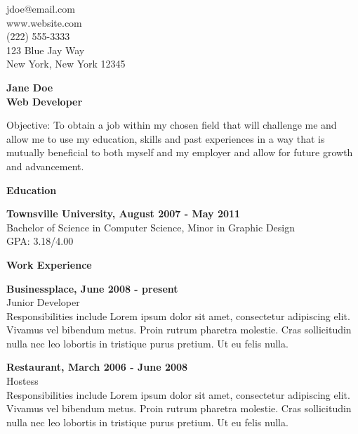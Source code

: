 \documentclass[a4paper,11pt,final]{memoir}
\newcommand{\Sep}{\vspace{1.5em}}
\newcommand{\SmallSep}{\vspace{0.5em}}
\newcommand{\CVSection}[1]
    {\Large\textbf{#1}\par
    \SmallSep\normalsize\normalfont}
\newcommand{\CVItem}[1]
    {\textbf{\color{RoyalBlue} #1}}
\begin{document}
%

\begin{flushright}\small 
    jdoe@email.com  \\
    www.website.com \\
    (222) 555-3333 \\
    123 Blue Jay Way \\
    New York, New York 12345 \\
\end{flushright}\normalsize
\framebreak


\Huge\bfseries {Jane Doe} \\
\Large\bfseries  {\color{RoyalBlue} Web Developer} \\

\normalsize\normalfont

Objective: To obtain a job within my chosen field that will challenge me and allow me to use my education, skills and past experiences in a way that is mutually beneficial to both myself and my employer and allow for future growth and advancement.
\Sep

\CVSection{Education}
\CVItem{Townsville University, August 2007 - May 2011}\\
Bachelor of Science in Computer Science, Minor in Graphic Design \\
GPA: 3.18/4.00
\SmallSep

\CVSection{Work Experience}
\CVItem{Businessplace, June 2008 - present}\\
Junior Developer \SmallSep \\
Responsibilities include Lorem ipsum dolor sit amet, consectetur adipiscing elit. Vivamus vel bibendum metus. Proin rutrum pharetra molestie. Cras sollicitudin nulla nec leo lobortis in tristique purus pretium. Ut eu felis nulla.
\SmallSep

\CVItem{Restaurant, March 2006 - June 2008}\\
Hostess \SmallSep \\
Responsibilities include Lorem ipsum dolor sit amet, consectetur adipiscing elit. Vivamus vel bibendum metus. Proin rutrum pharetra molestie. Cras sollicitudin nulla nec leo lobortis in tristique purus pretium. Ut eu felis nulla.
\SmallSep
\end{document}
